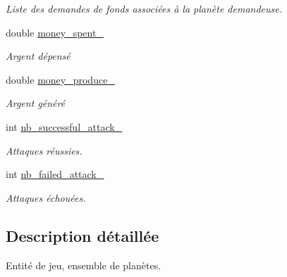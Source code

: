 \begin{DoxyCompactItemize}
\begin{DoxyCompactList}\small\item\em Liste des demandes de fonds associées à la planète demandeuse. \end{DoxyCompactList}\item 
\hypertarget{classFaction_ab2bf963b863c933fc8ed642fb40e5a2d}{double \hyperlink{classFaction_ab2bf963b863c933fc8ed642fb40e5a2d}{money\-\_\-spent\-\_\-}}\label{classFaction_ab2bf963b863c933fc8ed642fb40e5a2d}

\begin{DoxyCompactList}\small\item\em Argent dépensé \end{DoxyCompactList}\item 
\hypertarget{classFaction_a36bb2676770658222036e8a946d12970}{double \hyperlink{classFaction_a36bb2676770658222036e8a946d12970}{money\-\_\-produce\-\_\-}}\label{classFaction_a36bb2676770658222036e8a946d12970}

\begin{DoxyCompactList}\small\item\em Argent généré \end{DoxyCompactList}\item 
\hypertarget{classFaction_a8638c6f131570f20510d6430df54500e}{int \hyperlink{classFaction_a8638c6f131570f20510d6430df54500e}{nb\-\_\-successful\-\_\-attack\-\_\-}}\label{classFaction_a8638c6f131570f20510d6430df54500e}

\begin{DoxyCompactList}\small\item\em Attaques réussies. \end{DoxyCompactList}\item 
\hypertarget{classFaction_a95acbb795c24778afabd22df2a6fb12e}{int \hyperlink{classFaction_a95acbb795c24778afabd22df2a6fb12e}{nb\-\_\-failed\-\_\-attack\-\_\-}}\label{classFaction_a95acbb795c24778afabd22df2a6fb12e}

\begin{DoxyCompactList}\small\item\em Attaques échouées. \end{DoxyCompactList}\end{DoxyCompactItemize}


\subsection{Description détaillée}
Entité de jeu, ensemble de planètes. 

